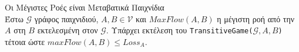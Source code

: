 {}
\begin{lemmagr}{Οι Μέγιστες Ροές είναι Μεταβατικά Παιχνίδια} \ \\
  \label{maxflowgame}
  Έστω $\mathcal{G}$ γράφος παιχνιδιού, $A, B \in \mathcal{V}$ και $MaxFlow\left(A, B\right)$ η μέγιστη ροή από την $A$ στη
  $B$ εκτελεσμένη στον $\mathcal{G}$. Υπάρχει εκτέλεση του \texttt{\textlatin{TransitiveGame}(}$\mathcal{G}, A, B$\texttt{)}
  τέτοια ώστε $maxFlow\left(A, B\right) \leq Loss_A$.
\end{lemmagr}
